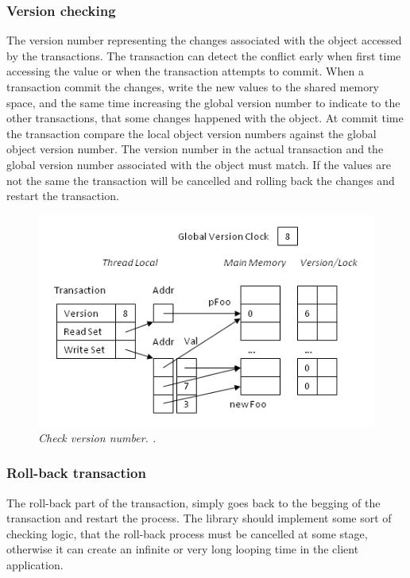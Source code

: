\documentclass[12pt]{article}
\begin{document}
\subsubsection{Version checking}
The version number representing the changes associated with the object accessed by the transactions. The transaction can detect the conflict early when first time accessing the value or when the transaction attempts to commit. When a transaction commit the changes, write the new values to the shared memory space, and the same time increasing the global version number to indicate to the other transactions, that some changes happened with the object. At commit time the transaction compare the local object version numbers against the global object version number. The version number in the actual transaction and the global version number associated with the object must match. If the values are not the same the transaction will be cancelled and rolling back the changes  and restart the transaction.

\begin{figure}[h!]
\centering
\includegraphics[scale=0.4]{Pictures/version.png}
\caption{\textit{\color{gray}Check version number. \cite{Bartosz}.}}
\end{figure}


\subsubsection{Roll-back transaction}
The roll-back part of the transaction, simply goes back to the begging of the transaction and restart the process. The library should implement some sort of checking logic, that the roll-back process must be cancelled at some stage, otherwise it can create an infinite or very long looping time in the client application.
\end{document}
